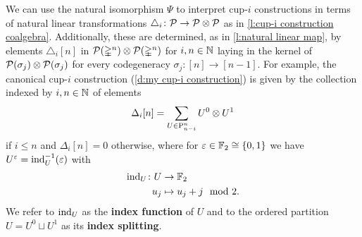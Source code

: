 We can use the natural isomorphism $\Psi$ to interpret cup-$i$ constructions in terms of natural linear transformations $\triangle_i \colon \mathcal{P} \to \mathcal{P} \otimes \mathcal{P}$ as in \cref{l:cup-i construction coalgebra}.
Additionally, these are determined, as in \cref{l:natural linear map}, by elements $\triangle_i[n]$ in $\mathcal{P}(\mathbb{\Delta}^n) \otimes \mathcal{P}(\mathbb{\Delta}^n)$ for $i, n \in \mathbb{N}$ laying in the kernel of $\mathcal{P}(\sigma_j) \otimes \mathcal{P}(\sigma_j)$ for every codegeneracy $\sigma_j \colon [n] \to [n-1]$.
For example, the canonical cup-$i$ construction (\cref{d:my cup-i construction}) is given by the collection indexed by $i, n \in \mathbb{N}$ of elements
\[
\Delta_i[n] = \sum_{U \in \mathrm{P}^n_{n-i}} U^0 \otimes U^1
\]
if $i \leq n$ and $\Delta_i[n] = 0$ otherwise, where for $\varepsilon \in {\mathbb{F}_2} \cong \{0,1\}$ we have $U^\varepsilon = \operatorname{ind}_U^{-1}(\varepsilon)$ with
\[
\begin{split}
\operatorname{ind}_U \colon U &\to {\mathbb{F}_2} \\
u_j &\mapsto u_j + j \mod 2.
\end{split}
\]
We refer to $\operatorname{ind}_U$ as the \textbf{index function} of $U$ and to the ordered partition $U = U^0 \sqcup U^1$ as its \textbf{index splitting}.


%
%
%

%
